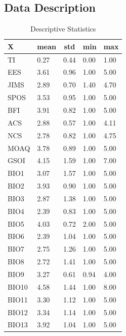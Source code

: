 \documentclass[
  man]{apa7}
\begin{document}
\subsection{Data Description}\label{data-description}

\begin{table}[tbp]

\begin{center}
\begin{threeparttable}

\caption{\label{tab:study2descr}Descriptive Statistics}

\begin{tabular}{lllll}
\toprule
X & \multicolumn{1}{c}{mean} & \multicolumn{1}{c}{std} & \multicolumn{1}{c}{min} & \multicolumn{1}{c}{max}\\
\midrule
TI & 0.27 & 0.44 & 0.00 & 1.00\\
EES & 3.61 & 0.96 & 1.00 & 5.00\\
JIMS & 2.89 & 0.70 & 1.40 & 4.70\\
SPOS & 3.53 & 0.95 & 1.00 & 5.00\\
BFI & 3.91 & 0.82 & 1.00 & 5.00\\
ACS & 2.88 & 0.57 & 1.00 & 4.11\\
NCS & 2.78 & 0.82 & 1.00 & 4.75\\
MOAQ & 3.78 & 0.89 & 1.00 & 5.00\\
GSOI & 4.15 & 1.59 & 1.00 & 7.00\\
BIO1 & 3.07 & 1.57 & 1.00 & 5.00\\
BIO2 & 3.93 & 0.90 & 1.00 & 5.00\\
BIO3 & 2.87 & 1.38 & 1.00 & 5.00\\
BIO4 & 2.39 & 0.83 & 1.00 & 5.00\\
BIO5 & 4.03 & 0.72 & 2.00 & 5.00\\
BIO6 & 2.39 & 1.04 & 1.00 & 5.00\\
BIO7 & 2.75 & 1.26 & 1.00 & 5.00\\
BIO8 & 2.72 & 1.41 & 1.00 & 5.00\\
BIO9 & 3.27 & 0.61 & 0.94 & 4.00\\
BIO10 & 4.58 & 1.44 & 1.00 & 8.00\\
BIO11 & 3.30 & 1.12 & 1.00 & 5.00\\
BIO12 & 3.34 & 1.14 & 1.00 & 5.00\\
BIO13 & 3.92 & 1.04 & 1.00 & 5.00\\
\bottomrule
\end{tabular}

\end{threeparttable}
\end{center}

\end{table}
\end{document}
